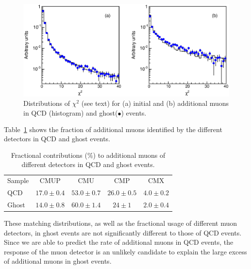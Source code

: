 \documentclass[aps,prd,preprint,floatfix,nofootinbib,superscriptaddress,showpacs,amssymb]{revtex4}
\begin{document}
 \begin{figure}
 \begin{center}
 \vspace{-0.3in}
 \leavevmode
 \includegraphics*[width=\textwidth]{fa0_muchi2.eps}
 \caption[]{Distributions of $\chi^2$ (see text) for (a) initial and (b)
            additional muons in QCD (histogram) and ghost($\bullet$) events.}
 \label{fig:fig_chi2}
 \end{center}
 \end{figure}
 Table~\ref{tab:tab_a1} shows the fraction of additional muons identified 
 by the different detectors in QCD and ghost events.
 \begin{table}
 \caption[]{Fractional contributions (\%) to additional muons of different
            detectors in QCD and ghost events.}
 \begin{center}
 \begin{ruledtabular}
 \begin{tabular}{lcccc}
  Sample &  CMUP          &  CMU           &     CMP         &   CMX   \\
   QCD   & $17.0 \pm 0.4$ & $53.0 \pm 0.7$ &  $26.0 \pm 0.5$ & $4.0 \pm 0.2$ \\
   Ghost & $14.0 \pm 0.8$ & $60.0 \pm 1.4$ &  $24   \pm 1$   & $2.0 \pm 0.4$ \\
 \end{tabular}
 \end{ruledtabular}
 \end{center}
 \label{tab:tab_a1}
 \end{table} 
 These matching distributions, as well as the fractional usage of
 different muon detectors, in ghost events are not significantly 
 different to those of QCD events. Since we are able to predict 
 the rate of additional muons in QCD events, the response of the
 muon detector is an unlikely candidate to explain the large excess
 of additional muons in ghost events.
\end{document}
